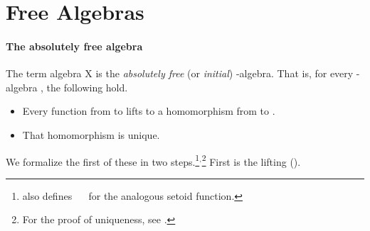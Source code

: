 
\section{Free Algebras}
\label{free-algebras}
\paragraph*{The absolutely free algebra}
The term algebra  \ab X is the \emph{absolutely free} (or \emph{initial})
-algebra. That is, for every -algebra , the following hold.
\begin{itemize}
\item Every function from  to  lifts to a homomorphism from   to .
\item That homomorphism is unique.
\end{itemize}
We formalize the first of these in two steps.\footnote{\agdaalgebras also defines
  \as{:} ~~
 for the analogous setoid function.}$^,$\footnote{For the proof of uniqueness,
see .}  First is the lifting ().

